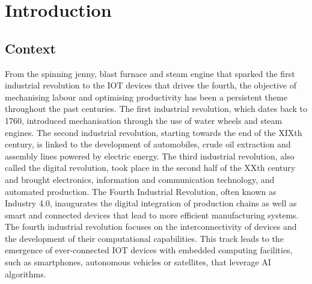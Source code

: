 \chapter{Introduction}\label{chap:intro}
\localtableofcontents


\section{Context}

From the spinning jenny, blast furnace and steam engine that sparked the first
industrial revolution to the \ac{IOT} devices that drives the fourth, the
objective of mechanising labour and optimising productivity has been a
persistent theme throughout the past centuries. The first industrial revolution,
which dates back to 1760, introduced mechanisation through the use of water
wheels and steam engines. The second industrial revolution, starting towards the
end of the \textsc{XIX}th century, is linked to the development of automobiles,
crude oil extraction and assembly lines powered by electric energy. The third
industrial revolution, also called the digital revolution, took place in the
second half of the \textsc{XX}th century and brought electronics, information
and communication technology, and automated production. The Fourth Industrial
Revolution, often known as Industry 4.0, inaugurates the digital integration of
production chains as well as smart and connected devices that lead to more
efficient manufacturing systems. The fourth industrial revolution focuses on the
interconnectivity of devices and the development of their computational
capabilities. This track leads to the emergence of ever-connected \ac{IOT}
devices with embedded computing facilities, such as smartphones, autonomous
vehicles or satellites, that leverage \ac{AI} algorithms.\\

